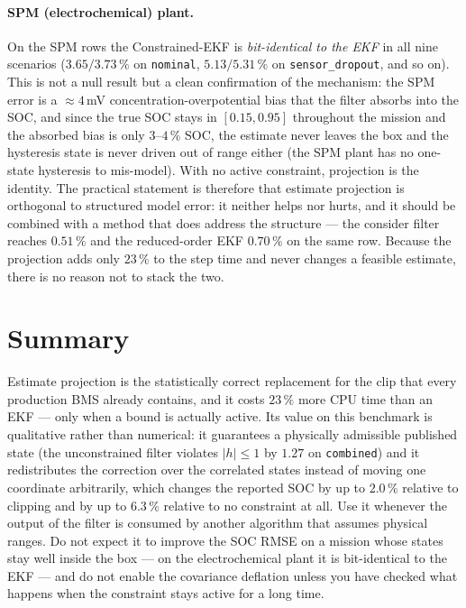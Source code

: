 \paragraph{SPM (electrochemical) plant.}  On the SPM rows the Constrained-EKF is \emph{bit-identical
to the EKF} in all nine scenarios ($3.65/3.73\,\%$ on \texttt{nominal}, $5.13/5.31\,\%$ on
\texttt{sensor\_dropout}, and so on).  This is not a null result but a clean confirmation of the
mechanism: the SPM error is a $\approx4$\,mV concentration-overpotential bias that the filter
absorbs into the SOC, and since the true SOC stays in $[0.15,0.95]$ throughout the mission and the
absorbed bias is only $3$--$4\,\%$ SOC, the estimate never leaves the box and the hysteresis state
is never driven out of range either (the SPM plant has no one-state hysteresis to mis-model).  With
no active constraint, projection is the identity.  The practical statement is therefore that
estimate projection is orthogonal to structured model error: it neither helps nor hurts, and it
should be combined with a method that does address the structure --- the consider filter reaches
$0.51\,\%$ and the reduced-order EKF $0.70\,\%$ on the same row.  Because the projection adds only
$23\,\%$ to the step time and never changes a feasible estimate, there is no reason not to stack
the two.


\section{Summary}
Estimate projection is the statistically correct replacement for the clip that every production
BMS already contains, and it costs $23\,\%$ more CPU time than an EKF --- only when a bound is
actually active.  Its value on this benchmark is qualitative rather than numerical: it guarantees
a physically admissible published state (the unconstrained filter violates $|h|\le1$ by $1.27$ on
\texttt{combined}) and it redistributes the correction over the correlated states instead of
moving one coordinate arbitrarily, which changes the reported SOC by up to $2.0\,\%$ relative to
clipping and by up to $6.3\,\%$ relative to no constraint at all.  Use it whenever the output of the
filter is consumed by another algorithm that assumes physical ranges.  Do not expect it to improve
the SOC RMSE on a mission whose states stay well inside the box --- on the electrochemical plant it
is bit-identical to the EKF --- and do not enable the covariance deflation unless you have checked
what happens when the constraint stays active for a long time.
